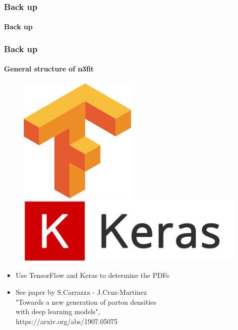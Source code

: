 \documentclass[aspectratio=43]{beamer}
\begin{document}
\begin{frame}

	\frametitle{Back up}
	\framesubtitle{Back up}
	
\end{frame}

\begin{frame}

	\frametitle{Back up}
	\framesubtitle{General structure of n3fit}
	
	\footnotesize
	
	\begin{figure}[!htb]
		\includegraphics[width = 0.5\linewidth]{plots/backup/TF.png}
		\endminipage\hfill
		\includegraphics[width = 0.5\linewidth]{plots/backup/Keras.png}
		\endminipage\hfill
	\end{figure}
	
	\begin{itemize}
		\item Use TensorFlow and Keras to determine the PDFs
		\item See paper by S.Carrazza - J.Cruz-Martinez \\
		{\color{blue}"Towards a new generation of parton densities\\ with deep learning models",\\ https://arxiv.org/abs/1907.05075}
	\end{itemize}

\end{frame}
\end{document}
